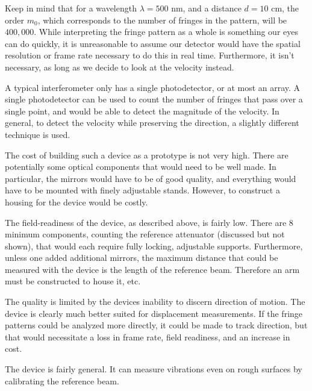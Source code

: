 \documentclass[a4paper,10pt]{report}
\numberwithin{equation}{section}
\begin{document}
Keep in mind that for a wavelength $\lambda=500$ nm, and a distance $d = 10$ cm, the order $m_0$, which corresponds to the number of fringes in the pattern, will be $400,000$.
While interpreting the fringe pattern as a whole is something our eyes can do quickly, it is unreasonable to assume our detector would have the spatial resolution or frame rate necessary to do this in real time. Furthermore, it isn't necessary, as long as we decide to look at the velocity instead. 

A typical interferometer only has a single photodetector, or at most an array. A single photodetector can be used to count the number of fringes that pass over a single point, and would be able to detect the magnitude of the velocity. In general, to detect the velocity while preserving the direction, a slightly different technique is used.\cite[p.~241]{Baker1990}

The cost of building such a device as a prototype is not very high. There are potentially some optical components that would need to be well made. In particular, the mirrors would have to be of good quality, and everything would have to be mounted with finely adjustable stands. However, to construct a housing for the device would be costly.

The field-readiness of the device, as described above, is fairly low. There are 8 minimum components, counting the reference attenuator (discussed but not shown), that would each require fully locking, adjustable supports. Furthermore, unless one added additional mirrors, the maximum distance that could be measured with the device is the length of the reference beam. Therefore an arm must be constructed to house it, etc.

The quality is limited by the devices inability to discern direction of motion. The device is clearly much better suited for displacement measurements. If the fringe patterns could be analyzed more directly, it could be made to track direction, but that would necessitate a loss in frame rate, field readiness, and an increase in cost.

The device is fairly general. It can measure vibrations even on rough surfaces by calibrating the reference beam.
\end{document}
